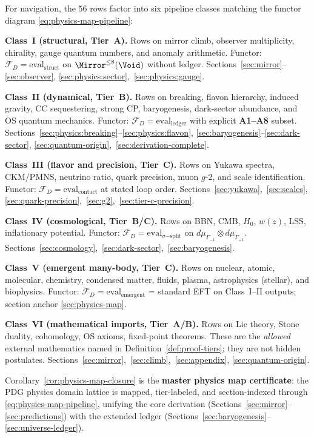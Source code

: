 For navigation, the $56$ rows factor into six pipeline classes matching the
functor diagram \eqref{eq:physics-map-pipeline}:

\medskip
\noindent\textbf{Class~I (structural, Tier~A).}
Rows on mirror climb, observer multiplicity, chirality, gauge quantum numbers,
and anomaly arithmetic. Functor: $\mathcal{F}_D=\mathrm{eval}_{\mathrm{struct}}$
on $\Mirror^{\leq 8}(\Void)$ without ledger. Sections~\ref{sec:mirror}--\ref{sec:observer},
\ref{sec:physics:sector},~\ref{sec:physics:gauge}.

\medskip
\noindent\textbf{Class~II (dynamical, Tier~B).}
Rows on breaking, flavon hierarchy, induced gravity, CC sequestering, strong CP,
baryogenesis, dark-sector abundance, and OS quantum mechanics. Functor:
$\mathcal{F}_D=\mathrm{eval}_{\mathrm{ledger}}$ with explicit \textbf{A1--A8}
subset. Sections~\ref{sec:physics:breaking}--\ref{sec:physics:flavon},
\ref{sec:baryogenesis}--\ref{sec:dark-sector},
\ref{sec:quantum-origin},~\ref{sec:derivation-complete}.

\medskip
\noindent\textbf{Class~III (flavor and precision, Tier~C).}
Rows on Yukawa spectra, CKM/PMNS, neutrino ratio, quark precision, muon $g$-2,
and scale identification. Functor: $\mathcal{F}_D=\mathrm{eval}_{\mathrm{contact}}$
at stated loop order. Sections~\ref{sec:yukawa},~\ref{sec:scales},
\ref{sec:quark-precision},~\ref{sec:g2},~\ref{sec:tier-c-precision}.

\medskip
\noindent\textbf{Class~IV (cosmological, Tier~B/C).}
Rows on BBN, CMB, $H_0$, $w(z)$, LSS, inflationary potential. Functor:
$\mathcal{F}_D=\mathrm{eval}_{\sigma\mathrm{-split}}$ on
$d\mu_{\Gamma_{-1}}\otimes d\mu_{\Gamma_{+1}}$.
Sections~\ref{sec:cosmology},~\ref{sec:dark-sector},~\ref{sec:baryogenesis}.

\medskip
\noindent\textbf{Class~V (emergent many-body, Tier~C).}
Rows on nuclear, atomic, molecular, chemistry, condensed matter, fluids,
plasma, astrophysics (stellar), and biophysics. Functor:
$\mathcal{F}_D=\mathrm{eval}_{\mathrm{emergent}}$ = standard EFT on Class~I--II
outputs; section anchor \ref{sec:physics-map}.

\medskip
\noindent\textbf{Class~VI (mathematical imports, Tier~A/B).}
Rows on Lie theory, Stone duality, cohomology, OS axioms, fixed-point theorems.
These are the \emph{allowed} external mathematics named in
Definition~\ref{def:proof-tiers}; they are not hidden postulates.
Sections~\ref{sec:mirror},~\ref{sec:climb},~\ref{sec:appendix},
\ref{sec:quantum-origin}.

\medskip
\noindent
Corollary~\ref{cor:physics-map-closure} is the \textbf{master physics map
certificate}: the PDG physics domain lattice is mapped, tier-labeled, and
section-indexed through \eqref{eq:physics-map-pipeline}, unifying the core
derivation (Sections~\ref{sec:mirror}--\ref{sec:predictions}) with the extended
ledger (Sections~\ref{sec:baryogenesis}--\ref{sec:universe-ledger}).